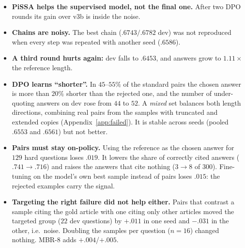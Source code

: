 \documentclass[11pt,a4paper]{article}
\begin{document}
\begin{itemize}[leftmargin=*]
\item \textbf{PiSSA helps the supervised model, not the final one.} After two DPO rounds its gain over v3b is inside the noise.
\item \textbf{Chains are noisy.} The best chain ($.6743/.6782$ dev) was not reproduced when every step was repeated with another seed ($.6586$).
\item \textbf{A third round hurts again:} dev falls to $.6453$, and answers grow to $1.11\times$ the reference length.
\item \textbf{DPO learns ``shorter''.} In $45$--$55\%$ of the standard pairs the chosen answer is more than $20\%$ shorter than the rejected one, and the number of under-quoting answers on dev rose from $44$ to $52$. A \emph{mixed} set balances both length directions, combining real pairs from the samples with truncated and extended copies (Appendix~\ref{app:failed}). It is stable across seeds (pooled $.6553$ and $.6561$) but not better.
\item \textbf{Pairs must stay on-policy.} Using the reference as the chosen answer for $129$ hard questions loses $.019$. It lowers the share of correctly cited answers ($.741\to.716$) and raises the answers that cite nothing ($3\to8$ of $300$). Fine-tuning on the model's own best sample instead of pairs loses $.015$: the rejected examples carry the signal.
\item \textbf{Targeting the right failure did not help either.} Pairs that contrast a sample citing the gold article with one citing only other articles moved the targeted group ($22$ dev questions) by $+.011$ in one seed and $-.031$ in the other, i.e.\ noise. Doubling the samples per question ($n{=}16$) changed nothing. MBR-8 adds $+.004$/$+.005$.
\end{itemize}
\end{document}
